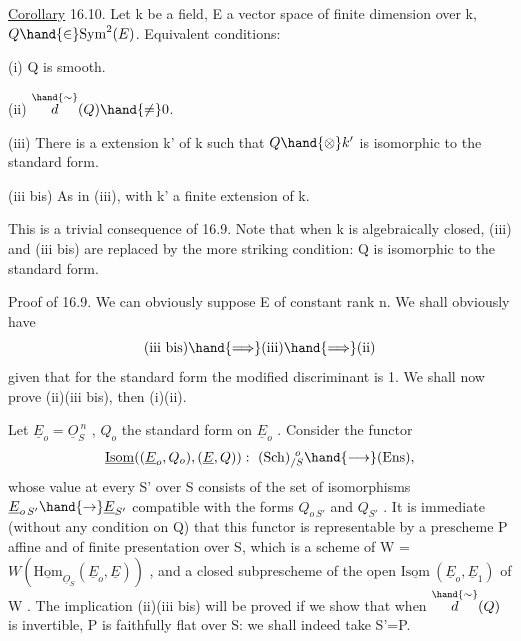 \uline{Corollary} 16.10. Let k be a field, E a vector space of finite dimension
over k, $Q \hand{\in} \mathrm{Sym}^2(E)$. Equivalent conditions:

(i) Q is smooth.

(ii) $\overset{\hand{\sim}}{d}(Q) \hand{\neq} 0$.

(iii) There is a  extension k' of k such that $Q\hand{\otimes} k'$ is
isomorphic to the standard form.

(iii bis) As in (iii), with k' a finite extension of k.

This is a trivial consequence of 16.9. Note that when k is
algebraically closed, (iii) and (iii bis) are replaced by the
more striking condition: Q is isomorphic to the standard form.

Proof of 16.9. We  can obviously
suppose E of constant rank n. We shall obviously have
\[ \text{(iii bis)} \hand{\Longrightarrow} \text{(iii)} \hand{\Longrightarrow} \text{(ii)} \]
given that for the standard form the modified discriminant is 1.
We shall now prove (ii)\hand{$\Longrightarrow$}(iii bis), then (i)\hand{$\Longleftrightarrow$}(ii).

Let $\underline{E}_o = \underline{O}_S^{\ n}$ , $Q_o$ the standard form on $\underline{E}_o$ . Consider the
functor
\[ \underline{\mathrm{Isom}}( (\underline{E}_o,Q_o),(\underline{E},Q)) :\ (\mathrm{Sch})_{/S}^{\ o} \hand{\longrightarrow} (\mathrm{Ens}) , \]
whose value at every S' over S consists of the set of isomorphisms
$\underline{E}_{o\,S'} \hand{\to} \underline{E}_{S'}$ compatible with the forms $Q_{o\,S'}$ and $Q_{S'}$ . It is immediate
(without any condition on  Q) that this functor is representable by a prescheme
P affine and of finite presentation over S, which is a scheme of W =
$W(\underline{\mathrm{Hom}}_{\underline{O}_S}(\underline{E}_o,\underline{E}))$ , and a closed subprescheme of  the open
$\underline{\mathrm{Isom}}\ (\underline{E}_o,\underline{E}_1)$ of W \hand{/}. The implication (ii)\hand{$\Longrightarrow$}(iii bis) will be proved if
we show that when $\overset{\hand{\sim}}{d}(Q)$ is invertible, P is faithfully flat
over S: we shall indeed take S'=P.


